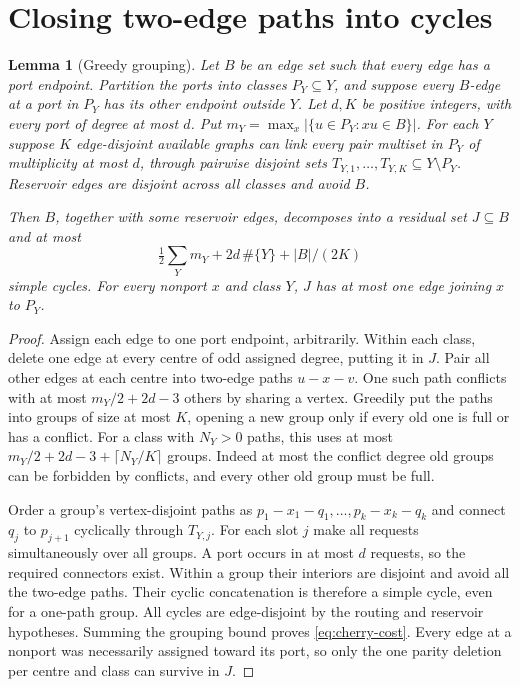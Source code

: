 \documentclass[11pt]{article}
\newtheorem{lemma}[theorem]{Lemma}
\theoremstyle{remark}\newtheorem*{remark}{Remark}
\begin{document}
\section{Closing two-edge paths into cycles}
\begin{lemma}[Greedy grouping]\label{lem:cherry}
Let $B$ be an edge set such that every edge has a port endpoint. Partition
the ports into classes $P_Y\subseteq Y$, and suppose every $B$-edge
at a port in $P_Y$ has its other endpoint outside $Y$.
Let $d,K$ be positive integers, with every port of degree at most $d$. Put
$m_Y=\max_x|\{u\in P_Y:xu\in B\}|$.
For each $Y$ suppose $K$ edge-disjoint available graphs can link every
pair multiset in $P_Y$ of multiplicity at most $d$, through pairwise
disjoint sets $T_{Y,1},\ldots,T_{Y,K}\subseteq Y\setminus P_Y$.
Reservoir edges are disjoint across all classes and avoid $B$.

Then $B$, together with some reservoir edges, decomposes into a residual
set $J\subseteq B$ and at most
\begin{equation}\label{eq:cherry-cost}
 \tfrac12\sum_Ym_Y+2d\,\#\{Y\}+|B|/(2K)
\end{equation}
simple cycles. For every nonport $x$ and class $Y$, $J$ has at most
one edge joining $x$ to $P_Y$.
\end{lemma}
\begin{proof}
Assign each edge to one port endpoint, arbitrarily. Within each class,
delete one edge at every centre of odd assigned degree, putting it in
$J$. Pair all other edges at each centre into two-edge paths $u-x-v$.
One such path conflicts with at most $m_Y/2+2d-3$ others by sharing a
vertex. Greedily put the paths into groups of size at most $K$, opening
a new group only if every old one is full or has a conflict. For a
class with $N_Y>0$ paths, this uses at most
$m_Y/2+2d-3+\lceil N_Y/K\rceil$ groups.
Indeed at most the conflict degree old groups can be forbidden by
conflicts, and every other old group must be full.

Order a group's vertex-disjoint paths as
$p_1-x_1-q_1,\ldots,p_k-x_k-q_k$ and connect $q_j$ to $p_{j+1}$
cyclically through $T_{Y,j}$. For each slot $j$ make all requests
simultaneously over all groups. A port occurs in at most $d$ requests,
so the required connectors exist. Within a group their interiors are
disjoint and avoid all the two-edge paths. Their cyclic concatenation
is therefore a simple cycle, even for a one-path group.
All cycles are edge-disjoint by the routing and reservoir hypotheses.
Summing the grouping bound proves \eqref{eq:cherry-cost}.
Every edge at a nonport was necessarily assigned toward its port, so
only the one parity deletion per centre and class can survive in $J$.
\end{proof}
\end{document}
